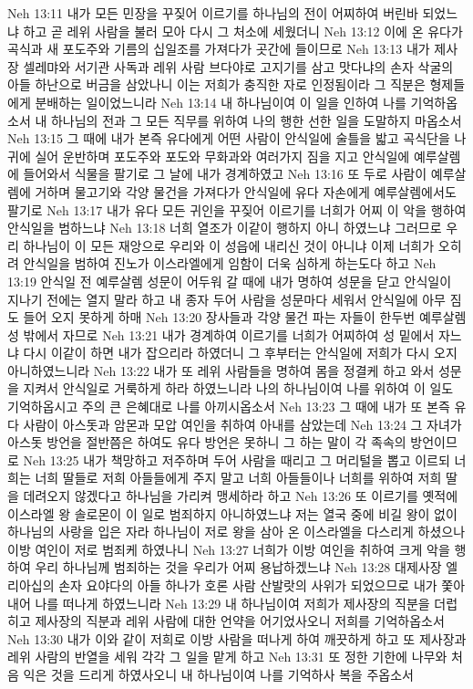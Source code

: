 Neh 13:11  내가 모든 민장을 꾸짖어 이르기를 하나님의 전이 어찌하여 버린바 되었느냐 하고 곧 레위 사람을 불러 모아 다시 그 처소에 세웠더니
Neh 13:12  이에 온 유다가 곡식과 새 포도주와 기름의 십일조를 가져다가 곳간에 들이므로
Neh 13:13  내가 제사장 셀레먀와 서기관 사독과 레위 사람 브다야로 고지기를 삼고 맛다냐의 손자 삭굴의 아들 하난으로 버금을 삼았나니 이는 저희가 충직한 자로 인정됨이라 그 직분은 형제들에게 분배하는 일이었느니라
Neh 13:14  내 하나님이여 이 일을 인하여 나를 기억하옵소서 내 하나님의 전과 그 모든 직무를 위하여 나의 행한 선한 일을 도말하지 마옵소서
Neh 13:15  그 때에 내가 본즉 유다에게 어떤 사람이 안식일에 술틀을 밟고 곡식단을 나귀에 실어 운반하며 포도주와 포도와 무화과와 여러가지 짐을 지고 안식일에 예루살렘에 들어와서 식물을 팔기로 그 날에 내가 경계하였고
Neh 13:16  또 두로 사람이 예루살렘에 거하며 물고기와 각양 물건을 가져다가 안식일에 유다 자손에게 예루살렘에서도 팔기로
Neh 13:17  내가 유다 모든 귀인을 꾸짖어 이르기를 너희가 어찌 이 악을 행하여 안식일을 범하느냐
Neh 13:18  너희 열조가 이같이 행하지 아니 하였느냐 그러므로 우리 하나님이 이 모든 재앙으로 우리와 이 성읍에 내리신 것이 아니냐 이제 너희가 오히려 안식일을 범하여 진노가 이스라엘에게 임함이 더욱 심하게 하는도다 하고
Neh 13:19  안식일 전 예루살렘 성문이 어두워 갈 때에 내가 명하여 성문을 닫고 안식일이 지나기 전에는 열지 말라 하고 내 종자 두어 사람을 성문마다 세워서 안식일에 아무 짐도 들어 오지 못하게 하매
Neh 13:20  장사들과 각양 물건 파는 자들이 한두번 예루살렘성 밖에서 자므로
Neh 13:21  내가 경계하여 이르기를 너희가 어찌하여 성 밑에서 자느냐 다시 이같이 하면 내가 잡으리라 하였더니 그 후부터는 안식일에 저희가 다시 오지 아니하였느니라
Neh 13:22  내가 또 레위 사람들을 명하여 몸을 정결케 하고 와서 성문을 지켜서 안식일로 거룩하게 하라 하였느니라 나의 하나님이여 나를 위하여 이 일도 기억하옵시고 주의 큰 은혜대로 나를 아끼시옵소서
Neh 13:23  그 때에 내가 또 본즉 유다 사람이 아스돗과 암몬과 모압 여인을 취하여 아내를 삼았는데
Neh 13:24  그 자녀가 아스돗 방언을 절반쯤은 하여도 유다 방언은 못하니 그 하는 말이 각 족속의 방언이므로
Neh 13:25  내가 책망하고 저주하며 두어 사람을 때리고 그 머리털을 뽑고 이르되 너희는 너희 딸들로 저희 아들들에게 주지 말고 너희 아들들이나 너희를 위하여 저희 딸을 데려오지 않겠다고 하나님을 가리켜 맹세하라 하고
Neh 13:26  또 이르기를 옛적에 이스라엘 왕 솔로몬이 이 일로 범죄하지 아니하였느냐 저는 열국 중에 비길 왕이 없이 하나님의 사랑을 입은 자라 하나님이 저로 왕을 삼아 온 이스라엘을 다스리게 하셨으나 이방 여인이 저로 범죄케 하였나니
Neh 13:27  너희가 이방 여인을 취하여 크게 악을 행하여 우리 하나님께 범죄하는 것을 우리가 어찌 용납하겠느냐
Neh 13:28  대제사장 엘리아십의 손자 요야다의 아들 하나가 호론 사람 산발랏의 사위가 되었으므로 내가 쫓아내어 나를 떠나게 하였느니라
Neh 13:29  내 하나님이여 저희가 제사장의 직분을 더럽히고 제사장의 직분과 레위 사람에 대한 언약을 어기었사오니 저희를 기억하옵소서
Neh 13:30  내가 이와 같이 저희로 이방 사람을 떠나게 하여 깨끗하게 하고 또 제사장과 레위 사람의 반열을 세워 각각 그 일을 맡게 하고
Neh 13:31  또 정한 기한에 나무와 처음 익은 것을 드리게 하였사오니 내 하나님이여 나를 기억하사 복을 주옵소서


